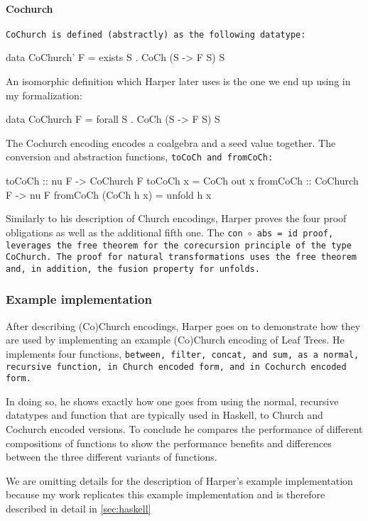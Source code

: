 \paragraph{Cochurch} \tt{CoChurch} is defined (abstractly) as the following datatype:
\begin{code}
data CoChurch' F = exists S . CoCh (S -> F S) S
\end{code}
An isomorphic definition which Harper later uses is the one we end up using in my formalization:
\begin{code}
data CoChurch F = forall S . CoCh (S -> F S) S
\end{code}
The Cochurch encoding encodes a coalgebra and a seed value together.
The conversion and abstraction functions, \tt{toCoCh} and \tt{fromCoCh}:
\begin{code}
toCoCh :: nu F -> CoChurch F
toCoCh x = CoCh out x
fromCoCh :: CoChurch F -> nu F
fromCoCh (CoCh h x) = unfold h x  
\end{code}
Similarly to his description of Church encodings, Harper proves the four proof obligations as well as the additional fifth one.
The \tt{con $\circ$ abs = id} proof, leverages the free theorem for the corecursion principle of the type \tt{CoChurch}.
The proof for natural transformations uses the free theorem and, in addition, the fusion property for unfolds.

\subsubsection{Example implementation}
After describing (Co)Church encodings, Harper goes on to demonstrate how they are used by implementing an example (Co)Church encoding of Leaf Trees.
He implements four functions, \tt{between}, \tt{filter}, \tt{concat}, and \tt{sum}, as a normal, recursive function, in Church encoded form, and in Cochurch encoded form.

In doing so, he shows exactly how one goes from using the normal, recursive datatypes and function that are typically used in Haskell, to Church and Cochurch encoded versions.
To conclude he compares the performance of different compositions of functions to show the performance benefits and differences between the three different variants of functions.

We are omitting details for the description of Harper's example implementation because my work replicates this example implementation and is therefore described in detail in \autoref{sec:haskell}


\iffalse
\begin{itemize}
    \Item 
\end{itemize}
\fi
